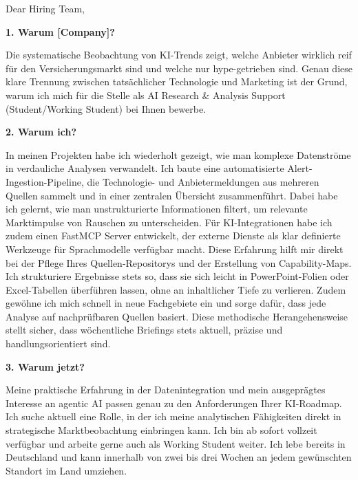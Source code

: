 \documentclass[11pt,a4paper]{coverletter}
\begin{document}

\opening{Dear Hiring Team,}

\vspace{8pt}\noindent\textbf{1. Warum [Company]?}\par\vspace{3pt}

Die systematische Beobachtung von KI-Trends zeigt, welche Anbieter wirklich reif für den Versicherungsmarkt sind und welche nur hype-getrieben sind. Genau diese klare Trennung zwischen tatsächlicher Technologie und Marketing ist der Grund, warum ich mich für die Stelle als AI Research \& Analysis Support (Student/Working Student) bei Ihnen bewerbe.

\vspace{8pt}\noindent\textbf{2. Warum ich?}\par\vspace{3pt}

In meinen Projekten habe ich wiederholt gezeigt, wie man komplexe Datenströme in verdauliche Analysen verwandelt. Ich baute eine automatisierte Alert-Ingestion-Pipeline, die Technologie- und Anbietermeldungen aus mehreren Quellen sammelt und in einer zentralen Übersicht zusammenführt. Dabei habe ich gelernt, wie man unstrukturierte Informationen filtert, um relevante Marktimpulse von Rauschen zu unterscheiden. Für KI-Integrationen habe ich zudem einen FastMCP Server entwickelt, der externe Dienste als klar definierte Werkzeuge für Sprachmodelle verfügbar macht. Diese Erfahrung hilft mir direkt bei der Pflege Ihres Quellen-Repositorys und der Erstellung von Capability-Maps. Ich strukturiere Ergebnisse stets so, dass sie sich leicht in PowerPoint-Folien oder Excel-Tabellen überführen lassen, ohne an inhaltlicher Tiefe zu verlieren. Zudem gewöhne ich mich schnell in neue Fachgebiete ein und sorge dafür, dass jede Analyse auf nachprüfbaren Quellen basiert. Diese methodische Herangehensweise stellt sicher, dass wöchentliche Briefings stets aktuell, präzise und handlungsorientiert sind.

\vspace{8pt}\noindent\textbf{3. Warum jetzt?}\par\vspace{3pt}

Meine praktische Erfahrung in der Datenintegration und mein ausgeprägtes Interesse an agentic AI passen genau zu den Anforderungen Ihrer KI-Roadmap. Ich suche aktuell eine Rolle, in der ich meine analytischen Fähigkeiten direkt in strategische Marktbeobachtung einbringen kann. Ich bin ab sofort vollzeit verfügbar und arbeite gerne auch als Working Student weiter. Ich lebe bereits in Deutschland und kann innerhalb von zwei bis drei Wochen an jedem gewünschten Standort im Land umziehen.
\end{document}
